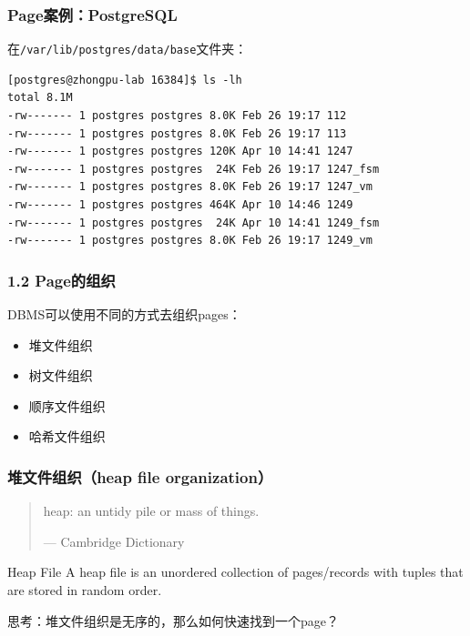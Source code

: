 \documentclass[aspectratio=169, 14pt]{beamer}
\begin{document}
\begin{frame}[fragile]
	\frametitle{Page案例：PostgreSQL}

	在\texttt{/var/lib/postgres/data/base}文件夹：

	\begin{verbatim}
[postgres@zhongpu-lab 16384]$ ls -lh
total 8.1M
-rw------- 1 postgres postgres 8.0K Feb 26 19:17 112
-rw------- 1 postgres postgres 8.0K Feb 26 19:17 113
-rw------- 1 postgres postgres 120K Apr 10 14:41 1247
-rw------- 1 postgres postgres  24K Feb 26 19:17 1247_fsm
-rw------- 1 postgres postgres 8.0K Feb 26 19:17 1247_vm
-rw------- 1 postgres postgres 464K Apr 10 14:46 1249
-rw------- 1 postgres postgres  24K Apr 10 14:41 1249_fsm
-rw------- 1 postgres postgres 8.0K Feb 26 19:17 1249_vm
  \end{verbatim}

\end{frame}


\begin{frame}
	\frametitle{1.2 Page的组织}
	DBMS可以使用不同的方式去组织pages：

	\begin{itemize}
		\item 堆文件组织
		\item 树文件组织
		\item 顺序文件组织
		\item 哈希文件组织
	\end{itemize}


\end{frame}

\begin{frame}
	\frametitle{堆文件组织（heap file organization）}

	\begin{quote}
		heap: an untidy pile or mass of things.
		\begin{flushright}
			--- Cambridge Dictionary
		\end{flushright}
	\end{quote}

	\begin{exampleblock}{Heap File}
		A heap file is an unordered collection of pages/records with tuples that are stored in random order.
	\end{exampleblock}

	 思考：堆文件组织是无序的，那么如何快速找到一个page？
\end{frame}
\end{document}
